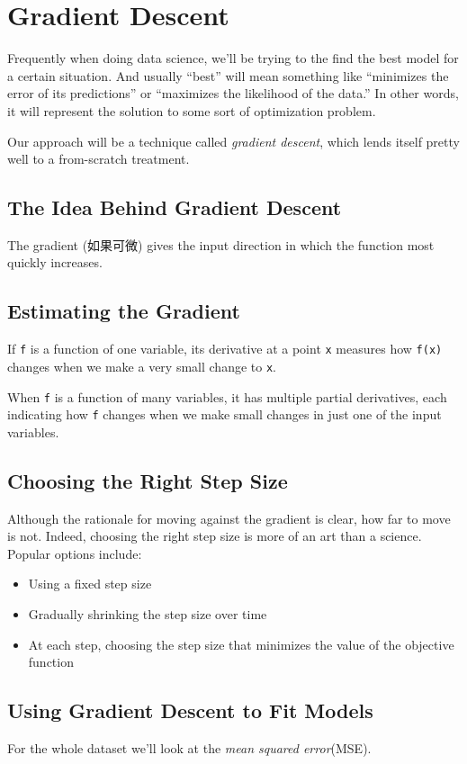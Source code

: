 \chapter{Gradient Descent}
Frequently when doing data science, we’ll be trying to the find the best model for a
certain situation. And usually “best” will mean something like “minimizes the error
of its predictions” or “maximizes the likelihood of the data.” In other words, it will
represent the solution to some sort of optimization problem.

Our approach will be a technique called \emph{gradient descent}, which lends itself pretty well to a from-scratch treatment.

\section{The Idea Behind Gradient Descent}
The gradient (如果可微) gives the input direction in which the function most quickly increases.

\section{Estimating the Gradient}
If \verb|f| is a function of one variable, its derivative at a point \verb|x| measures how \verb|f(x)|
changes when we make a very small change to \verb|x|.

When \verb|f| is a function of many variables, it has multiple partial derivatives, each indicating how \verb|f| changes when we make small changes in just one of the input variables.

\section{Choosing the Right Step Size}
Although the rationale for moving against the gradient is clear, how far to move is not.
Indeed, choosing the right step size is more of an art than a science. Popular
options include:
\begin{itemize}
    \item Using a fixed step size
    \item Gradually shrinking the step size over time
    \item At each step, choosing the step size that minimizes the value of the objective function
\end{itemize}
\section{Using Gradient Descent to Fit Models}
For the whole dataset we’ll look at the \emph{mean squared error}(MSE). 


